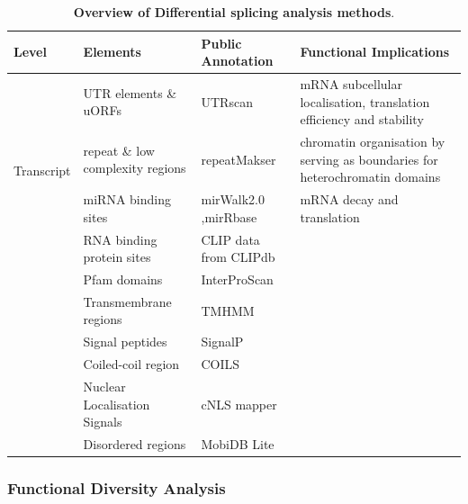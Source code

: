 \begin{changemargin}{1cm}	
	\begin{landscape}
		\small %
		\setlength\tabcolsep{2pt} %
		\renewcommand{\arraystretch}{1}
		\begin{longtable}[c]{p{2cm}p{5cm}p{5cm}p{13.5cm}}
		\caption[Overview of Differential splicing analysis methods]%
		{\textbf{Overview of Differential splicing analysis methods}. \newline }
		\label{tab: tappas_publicannotations}\\
				\toprule
		Level                    & Elements                     & Public Annotation     & Functional Implications    \\ \midrule
		\multirow{4}{*}{Transcript} & UTR elements \& uORFs & UTRscan      & mRNA subcellular localisation, translation efficiency and stability           \\
		& repeat \& low complexity regions & repeatMakser & chromatin organisation by serving as boundaries for heterochromatin   domains \\
		& miRNA binding sites          & mirWalk2.0 ,mirRbase  & mRNA decay and translation \\
		& RNA binding protein sites    & CLIP data from CLIPdb &                            \\
		\hdashline[0.5pt/5pt]
		\multirow{6}{*}{Protein} & Pfam domains                 & InterProScan          &                            \\
		& Transmembrane regions        & TMHMM                 &                            \\
		& Signal peptides              & SignalP               &                            \\
		& Coiled-coil region           & COILS                 &                            \\
		& Nuclear Localisation Signals & cNLS mapper           &                            \\
		& Disordered regions           & MobiDB Lite           &                            \\ \bottomrule
		\end{longtable}
	\end{landscape}
\end{changemargin}



\subsubsection{Functional Diversity Analysis}


